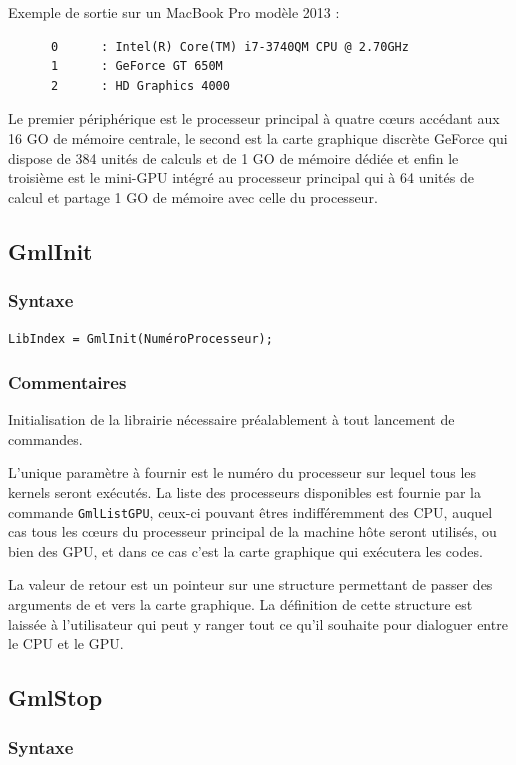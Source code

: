 \documentclass[a4paper,12pt]{article}
\begin{document}
Exemple de sortie sur un MacBook Pro modèle 2013 :
\begin{tt}
\begin{verbatim}
      0      : Intel(R) Core(TM) i7-3740QM CPU @ 2.70GHz
      1      : GeForce GT 650M
      2      : HD Graphics 4000
\end{verbatim}
\end{tt}
\normalfont

Le premier périphérique est le processeur principal à quatre c\oe urs accédant aux 16 GO de mémoire centrale, le second est la carte graphique discrète GeForce qui dispose de 384 unités de calculs et de 1 GO de mémoire dédiée et enfin le troisième est le mini-GPU intégré au processeur principal qui à 64 unités de calcul et partage 1 GO de mémoire avec celle du processeur.

\subsection{GmlInit}
\subsubsection*{Syntaxe}

{\tt LibIndex = GmlInit(NuméroProcesseur);}
\subsubsection*{Commentaires}

Initialisation de la librairie nécessaire préalablement à tout lancement de commandes.

L'unique paramètre à fournir est le numéro du processeur sur lequel tous les kernels seront exécutés. La liste des processeurs disponibles est fournie par la commande {\tt GmlListGPU}, ceux-ci pouvant êtres indifféremment des CPU, auquel cas tous les c\oe urs du processeur principal de la machine hôte seront utilisés, ou bien des GPU, et dans ce cas c'est la carte graphique qui exécutera les codes.

La valeur de retour est un pointeur sur une structure permettant de passer des arguments de et vers la carte graphique. La définition de cette structure est laissée à l'utilisateur qui peut y ranger tout ce qu'il souhaite pour dialoguer entre le CPU et le GPU.


\subsection{GmlStop}
\subsubsection*{Syntaxe}
\end{document}

